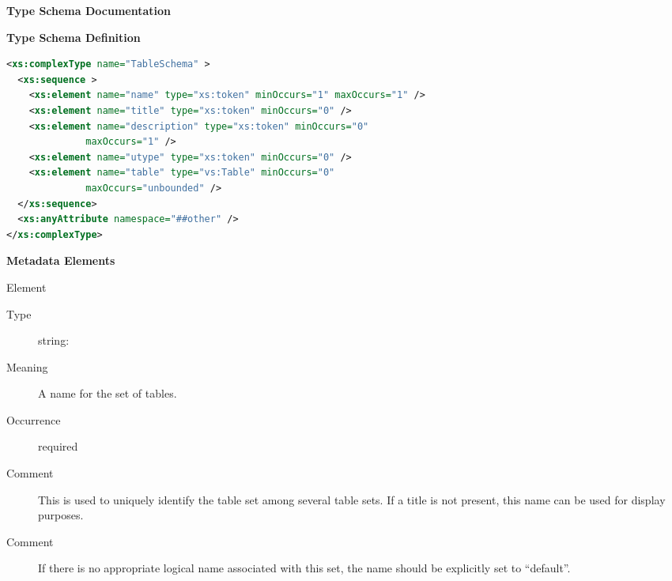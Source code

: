 \documentclass[11pt,a4paper]{ivoa}
\begin{document}
\begin{generated}
\begingroup
      	\renewcommand*\descriptionlabel[1]{%
      	\hbox to 5.5em{\emph{#1}\hfil}}\vspace{2ex}\noindent\textbf{ Type Schema Documentation}


\vspace{1ex}\noindent\textbf{ Type Schema Definition}

\begin{lstlisting}[language=XML,basicstyle=\footnotesize]
<xs:complexType name="TableSchema" >
  <xs:sequence >
    <xs:element name="name" type="xs:token" minOccurs="1" maxOccurs="1" />
    <xs:element name="title" type="xs:token" minOccurs="0" />
    <xs:element name="description" type="xs:token" minOccurs="0"
              maxOccurs="1" />
    <xs:element name="utype" type="xs:token" minOccurs="0" />
    <xs:element name="table" type="vs:Table" minOccurs="0"
              maxOccurs="unbounded" />
  </xs:sequence>
  <xs:anyAttribute namespace="##other" />
</xs:complexType>
\end{lstlisting}

\vspace{0.5ex}\noindent\textbf{ Metadata Elements}

\begingroup\small\begin{bigdescription}\item[Element \xmlel{name}]
\begin{description}
\item[Type] string: 
\item[Meaning] 
               A name for the set of tables.  
             
\item[Occurrence] required
\item[Comment] 
               This is used to uniquely identify the table set among
               several table sets.  If a title is not present, this
               name can be used for display purposes.
             
\item[Comment] 
               If there is no appropriate logical name associated with
               this set, the name should be explicitly set to
               “default”.  
             


\end{description}
\end{bigdescription}
\end{generated}
\end{document}
